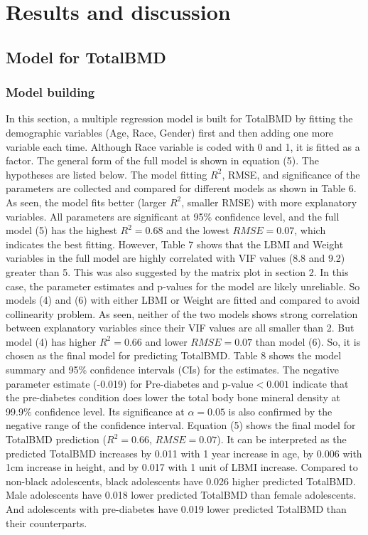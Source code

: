 \documentclass[11pt]{article}
\begin{document}
\section{Results and discussion}
\subsection{Model for TotalBMD}
\subsubsection {Model building}
In this section, a multiple regression model is built for TotalBMD by fitting the demographic variables (Age, Race, Gender) first and then adding one more variable each time. Although Race variable is coded with 0 and 1, it is fitted as a factor. The general form of the full model is shown in equation (5). The hypotheses are listed below. The model fitting $R^2$, RMSE, and significance of the parameters are collected and compared for different models as shown in Table 6. As seen, the model fits better (larger $R^2$, smaller RMSE) with more explanatory variables. All parameters are significant at 95\% confidence level, and the full model (5) has the highest $R^2 =0.68$ and the lowest $RMSE=0.07$, which indicates the best fitting. However, Table 7 shows that the LBMI and Weight variables in the full model are highly correlated with VIF values (8.8 and 9.2) greater than 5. This was also suggested by the matrix plot in section 2. In this case, the parameter estimates and p-values for the model are likely unreliable. So models (4) and (6) with either LBMI or Weight are fitted and compared to avoid collinearity problem. As seen, neither of the two models shows strong correlation between explanatory variables since their VIF values are all smaller than 2. But model (4) has higher $R^2=0.66$ and lower $RMSE=0.07$ than model (6). So, it is chosen as the final model for predicting TotalBMD. Table 8 shows the model summary and 95\% confidence intervals (CIs) for the estimates. The negative parameter estimate (-0.019) for Pre-diabetes and p-value$<0.001$ indicate that the pre-diabetes condition does lower the total body bone mineral density at 99.9\% confidence level. Its significance at $\alpha=0.05$ is also confirmed by the negative range of the confidence interval. Equation (5) shows the final model for TotalBMD prediction ($R^2=0.66$, $RMSE=0.07$). It can be interpreted as the predicted TotalBMD increases by 0.011 with 1 year increase in age, by 0.006 with 1cm increase in height, and by 0.017 with 1 unit of LBMI increase. Compared to non-black adolescents, black adolescents have 0.026 higher predicted TotalBMD. Male adolescents have 0.018 lower predicted TotalBMD than female adolescents. And adolescents with pre-diabetes have 0.019 lower predicted TotalBMD than their counterparts.  
\end{document}
